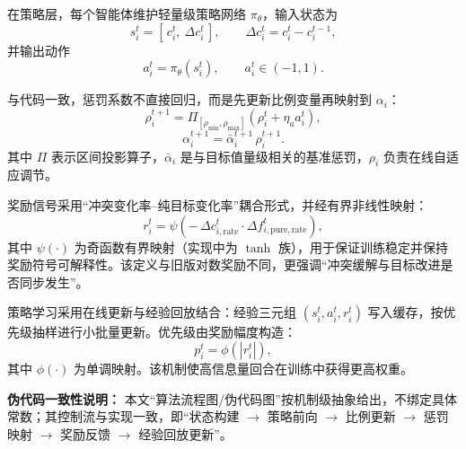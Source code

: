 \documentclass[conference]{IEEEtran}
\begin{document}
在策略层，每个智能体维护轻量级策略网络 \(\pi_\theta\)，输入状态为
\[
s_i^t=[\,c_i^t,\ \Delta c_i^t\,],\qquad
\Delta c_i^t=c_i^t-c_i^{t-1},
\]
并输出动作
\[
a_i^t=\pi_\theta(s_i^t),\qquad a_i^t\in(-1,1).
\]

与代码一致，惩罚系数不直接回归，而是先更新比例变量再映射到 \(\alpha_i\)：
\[
\rho_i^{t+1}=\Pi_{[\rho_{\min},\rho_{\max}]}\!\left(\rho_i^t+\eta_a a_i^t\right),
\]
\[
\alpha_i^{t+1}=\bar{\alpha}_i^{t+1}\,\rho_i^{t+1}.
\]
其中 \(\Pi\) 表示区间投影算子，\(\bar{\alpha}_i\) 是与目标值量级相关的基准惩罚，\(\rho_i\) 负责在线自适应调节。

奖励信号采用“冲突变化率--纯目标变化率”耦合形式，并经有界非线性映射：
\[
r_i^t=\psi\!\left(-\,\Delta c_{i,\mathrm{rate}}^t\cdot \Delta f_{i,\mathrm{pure,rate}}^t\right),
\]
其中 \(\psi(\cdot)\) 为奇函数有界映射（实现中为 \(\tanh\) 族），用于保证训练稳定并保持奖励符号可解释性。该定义与旧版对数奖励不同，更强调“冲突缓解与目标改进是否同步发生”。

策略学习采用在线更新与经验回放结合：经验三元组 \((s_i^t,a_i^t,r_i^t)\) 写入缓存，按优先级抽样进行小批量更新。优先级由奖励幅度构造：
\[
p_i^t=\phi\!\left(|r_i^t|\right),
\]
其中 \(\phi(\cdot)\) 为单调映射。该机制使高信息量回合在训练中获得更高权重。

\textbf{伪代码一致性说明：} 本文“算法流程图/伪代码图”按机制级抽象给出，不绑定具体常数；其控制流与实现一致，即“状态构建 \(\rightarrow\) 策略前向 \(\rightarrow\) 比例更新 \(\rightarrow\) 惩罚映射 \(\rightarrow\) 奖励反馈 \(\rightarrow\) 经验回放更新”。
\end{document}
